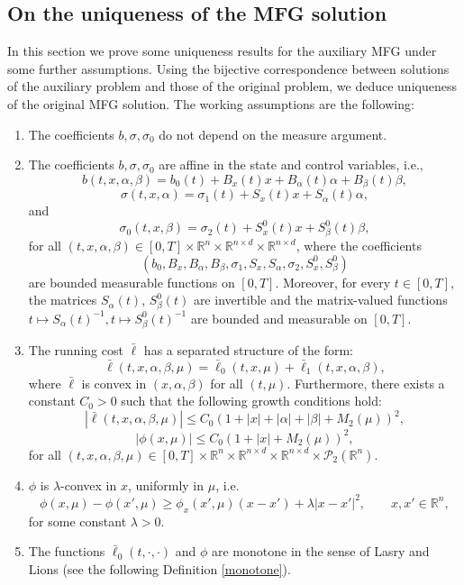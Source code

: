 \documentclass[11pt,a4paper]{article}
\begin{document}
\subsection{On the uniqueness of the MFG solution}
In this section we prove some uniqueness results for the auxiliary MFG under some further assumptions. Using the bijective correspondence between solutions of the auxiliary problem and those of the original problem, we deduce uniqueness of the original MFG solution. The working assumptions are the following:
\begin{enumerate}
    
\item[(C1)] The coefficients $b, \sigma, \sigma_0$ do not depend on the measure argument.

\item[(C2)] The coefficients $b, \sigma, \sigma_0$ are affine in the state and control variables, i.e.,
    \[ b(t,x,\alpha,\beta)=b_0(t)+B_x(t)x+B_\alpha(t)\alpha+B_\beta(t)\beta, \] 
    \[ \sigma(t,x,\alpha)=\sigma_1(t)+S_x(t)x+S_\alpha(t)\alpha, \] 
    and 
    \[ \sigma_0(t,x,\beta)=\sigma_2(t)+S_x^0(t)x+S_\beta^0(t)\beta, \] 
    for all $(t,x,\alpha,\beta) \in [0, T]\times \mathbb{R}^n \times \mathbb{R}^{n\times d} \times \mathbb{R}^{n\times d}$, where the coefficients
    \[ (b_0, B_x, B_\alpha, B_\beta, \sigma_1, S_x, S_\alpha, \sigma_2, S_x^0, S_\beta^0) \]
    are bounded measurable functions on $[0,T]$. Moreover, for every \(t \in [0,T]\), the matrices \(S_\alpha(t)\), \(S_\beta^0(t)\) are invertible and  the matrix-valued functions
$t \mapsto S_\alpha(t)^{-1},
t \mapsto S_\beta^0(t)^{-1}$
are bounded and measurable on \([0,T]\).

\item[(C3)]  The  running cost $\bar{\ell}$ has a separated structure of the form:
    \[ \bar{\ell}(t,x,\alpha,\beta,\mu) = \bar \ell_{0}(t,x,\mu) + \bar{\ell}_{1}(t,x,\alpha,\beta), \]
    where $\bar{\ell}$ is convex in $(x, \alpha, \beta)$ for all $(t, \mu)$. Furthermore, there exists a constant $C_0 > 0$ such that the following growth conditions hold:
    \[ |\bar{\ell}(t,x,\alpha,\beta,\mu)| \leq C_{0}\left(1+|x|+|\alpha|+|\beta|+M_{2}(\mu)\right)^{2}, \]
    \[ |\phi(x,\mu)| \leq C_{0}\left(1+|x|+M_{2}(\mu)\right)^{2}, \]
    for all $(t,x,\alpha,\beta,\mu) \in [0, T]\times \mathbb{R}^n \times \mathbb{R}^{n\times d} \times \mathbb{R}^{n\times d} \times \mathcal{P}_2(\mathbb{R}^n)$.
 

\item [(C4)] $\phi$ is
$\lambda$-convex in $x$, uniformly in $\mu$, i.e.
\[
\phi(x,\mu)-\phi(x',\mu)
\geq
\phi_x(x',\mu)(x-x')+\lambda |x-x'|^2,
\qquad x,x'\in\mathbb R^n,
\]
for some constant $\lambda>0$.
\item [(C5)]
The functions \( \bar \ell_0(t, \cdot, \cdot) \)  and \( \phi \) are monotone in the sense of Lasry and Lions (see the following Definition \ref{monotone}).
\end{enumerate}
\end{document}
